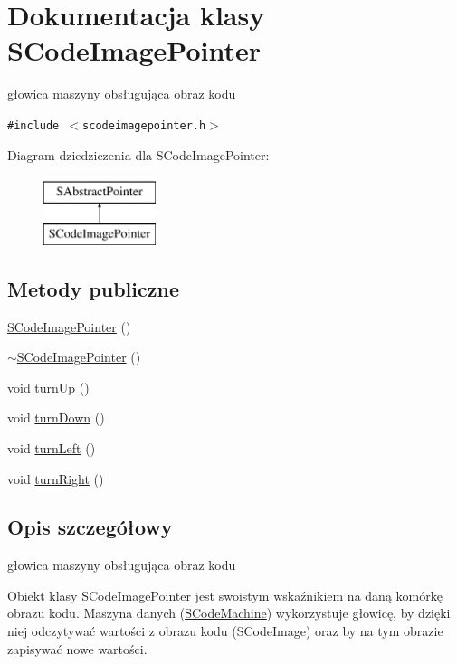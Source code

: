 \hypertarget{classSCodeImagePointer}{
\section{Dokumentacja klasy SCodeImagePointer}
\label{classSCodeImagePointer}
}
głowica maszyny obsługująca obraz kodu  


{\tt \#include $<$scodeimagepointer.h$>$}

Diagram dziedziczenia dla SCodeImagePointer:\begin{figure}[H]
\begin{center}
\leavevmode
\includegraphics[height=2cm]{classSCodeImagePointer}
\end{center}
\end{figure}
\subsection*{Metody publiczne}
\begin{CompactItemize}
\item 
\hyperlink{classSCodeImagePointer_bcef321f6fed2e37ca660978d86a3ecb}{SCodeImagePointer} ()
\item 
\hyperlink{classSCodeImagePointer_65cc13e9ddfa6b12ff7ef24f658b5015}{$\sim$SCodeImagePointer} ()
\item 
void \hyperlink{classSCodeImagePointer_01367459d424aa6155f98c8cd8b930d5}{turnUp} ()
\item 
void \hyperlink{classSCodeImagePointer_fd353f45c3b71bfd402bbef5f9248752}{turnDown} ()
\item 
void \hyperlink{classSCodeImagePointer_a3e17be0016265dfb389d64fe63c24ac}{turnLeft} ()
\item 
void \hyperlink{classSCodeImagePointer_352a2e1c0039812322ce48e183e246de}{turnRight} ()
\end{CompactItemize}


\subsection{Opis szczegółowy}
głowica maszyny obsługująca obraz kodu 

Obiekt klasy \hyperlink{classSCodeImagePointer}{SCodeImagePointer} jest swoistym wskaźnikiem na daną komórkę obrazu kodu. Maszyna danych (\hyperlink{classSCodeMachine}{SCodeMachine}) wykorzystuje głowicę, by dzięki niej odczytywać wartości z obrazu kodu (SCodeImage) oraz by na tym obrazie zapisywać nowe wartości. 

